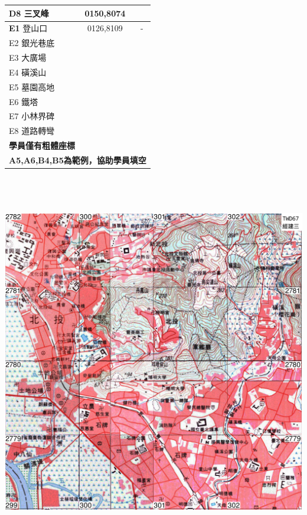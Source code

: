 \documentclass{article}
\begin{document}
\begin{CJK*}{UTF8}{bkai}
\begin{multicols}{2}
\begin{tabular}{|l|c|l|}
	\textbf{D8} 三叉峰&0150,8074&\\
	\hline
	\textbf{E1} 登山口&0126,8109&-\\
	E2 銀光巷底& &\\
	E3 大廣場& &\\
	E4 磺溪山& &\\
	E5 墓園高地& &\\
	E6 鐵塔& &\\
	E7 小林界碑& &\\
	E8 道路轉彎& &\\
	\hline
	\multicolumn{3}{l}{\textbf{學員僅有粗體座標}}\\
	\multicolumn{3}{l}{\textbf{A5,A6,B4,B5為範例，協助學員填空}}
\end{tabular}


\cleardoublepage

\includegraphics[width=20.73cm, height=16.58cm]{v3.png}


\end{multicols}
\end{CJK*}
\end{document}
